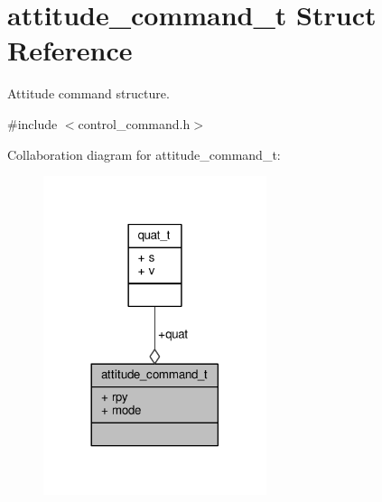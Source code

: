 \hypertarget{structattitude__command__t}{\section{attitude\+\_\+command\+\_\+t Struct Reference}
\label{structattitude__command__t}
}


Attitude command structure.  




{\ttfamily \#include $<$control\+\_\+command.\+h$>$}



Collaboration diagram for attitude\+\_\+command\+\_\+t\+:
\nopagebreak
\begin{figure}[H]
\begin{center}
\leavevmode
\includegraphics[width=185pt]{structattitude__command__t__coll__graph}
\end{center}
\end{figure}
